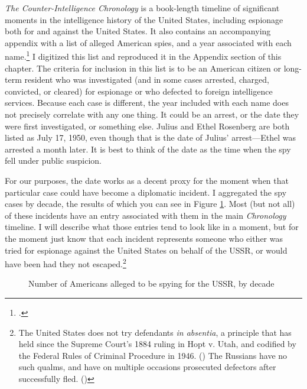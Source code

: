 \documentclass{memoir}
\begin{document}
\begin{refsegment}
\emph{The Counter-Intelligence Chronology} is a book-length timeline of significant moments in the intelligence history of the United States, including espionage both for and against the United States. It also contains an accompanying appendix with a list of alleged American spies, and a year associated with each name.\footcite[p.~173]{mickolus_counterintelligence_2015} I digitized this list and reproduced it in the Appendix section of this chapter. The criteria for inclusion in this list is to be an American citizen or long-term resident who was investigated (and in some cases arrested, charged, convicted, or cleared) for espionage or who defected to foreign intelligence services. Because each case is different, the year included with each name does not precisely correlate with any one thing. It could be an arrest, or the date they were first investigated, or something else. Julius and Ethel Rosenberg are both listed as July 17, 1950, even though that is the date of Julius' arrest---Ethel was arrested a month later. It is best to think of the date as the time when the spy fell under public suspicion.

For our purposes, the date works as a decent proxy for the moment when that particular case could have become a diplomatic incident. I aggregated the spy cases by decade, the results of which you can see in Figure \ref{decade_spies}. Most (but not all) of these incidents have an entry associated with them in the main \emph{Chronology} timeline. I will describe what those entries tend to look like in a moment, but for the moment just know that each incident represents someone who either was tried for espionage against the United States on behalf of the USSR, or would have been had they not escaped.\footnote{The United States does not try defendants \emph{in absentia}, a principle that has held since the Supreme Court's 1884 ruling in Hopt v. Utah, and codified by the Federal Rules of Criminal Procedure in 1946. (\cite{noauthor_rule_1946-1}) The Russians have no such qualms, and have on multiple occasions prosecuted defectors after successfully fled. (\cite{traynor_trial_2002})}

\begin{figure}[ht]
  \centering
  
  \label{decade_spies}
  \caption{Number of Americans alleged to be spying for the USSR, by decade}
\end{figure}


\end{refsegment}
\end{document}
